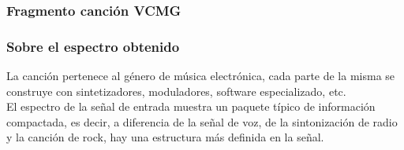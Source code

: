 \documentclass[12pt]{beamer}
\begin{document}
\begin{frame}
\frametitle{Fragmento canción VCMG}
\begin{figure}
    \centering
\end{figure}
\end{frame}
\begin{frame}
\frametitle{Sobre el espectro obtenido}
La canción pertenece al género de música electrónica, cada parte de la misma se construye con sintetizadores, moduladores, software especializado, etc.
\\
\bigskip
\pause
El espectro de la señal de entrada muestra un paquete típico de información compactada, es decir, a diferencia de la señal de voz, de la sintonización de radio y la canción de rock, hay una estructura más definida en la señal.
\end{frame}
\end{document}
